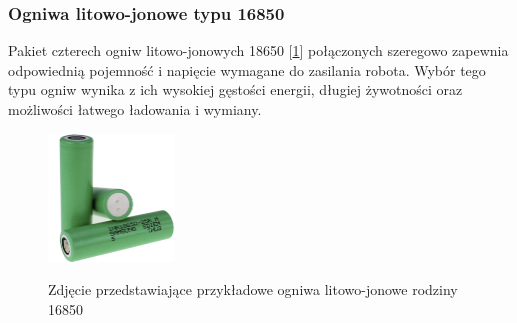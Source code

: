 \subsubsection*{Ogniwa litowo-jonowe typu 16850}
Pakiet czterech ogniw litowo-jonowych 18650 [\ref{zdj:ogniwa}] połączonych szeregowo zapewnia odpowiednią pojemność i napięcie wymagane do zasilania robota. Wybór tego typu ogniw wynika z ich wysokiej gęstości energii, długiej żywotności oraz możliwości łatwego ładowania i wymiany.

\begin{figure}[h!]
        \centering
        \includegraphics[width=0.3\textwidth]{./graf/ogniwa.png}
        \label{zdj:ogniwa}
        \caption{Zdjęcie przedstawiające przykładowe ogniwa litowo-jonowe rodziny 16850}
\end{figure}

\clearpage

    

